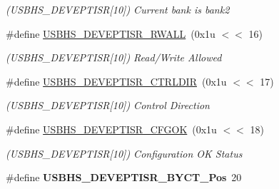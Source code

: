 \begin{DoxyCompactItemize}
\begin{DoxyCompactList}\small\item\em (U\+S\+B\+H\+S\+\_\+\+D\+E\+V\+E\+P\+T\+I\+SR\mbox{[}10\mbox{]}) Current bank is bank2 \end{DoxyCompactList}\item 
\mbox{\label{group__SAMS70__USBHS_gac2222730ead1f5af9fbc5c3759d7b887}} 
\#define \mbox{\hyperlink{group__SAMS70__USBHS_gac2222730ead1f5af9fbc5c3759d7b887}{U\+S\+B\+H\+S\+\_\+\+D\+E\+V\+E\+P\+T\+I\+S\+R\+\_\+\+R\+W\+A\+LL}}~(0x1u $<$$<$ 16)
\begin{DoxyCompactList}\small\item\em (U\+S\+B\+H\+S\+\_\+\+D\+E\+V\+E\+P\+T\+I\+SR\mbox{[}10\mbox{]}) Read/\+Write Allowed \end{DoxyCompactList}\item 
\mbox{\label{group__SAMS70__USBHS_ga771d902b6fdb7b43ba20de29e7a14b8a}} 
\#define \mbox{\hyperlink{group__SAMS70__USBHS_ga771d902b6fdb7b43ba20de29e7a14b8a}{U\+S\+B\+H\+S\+\_\+\+D\+E\+V\+E\+P\+T\+I\+S\+R\+\_\+\+C\+T\+R\+L\+D\+IR}}~(0x1u $<$$<$ 17)
\begin{DoxyCompactList}\small\item\em (U\+S\+B\+H\+S\+\_\+\+D\+E\+V\+E\+P\+T\+I\+SR\mbox{[}10\mbox{]}) Control Direction \end{DoxyCompactList}\item 
\mbox{\label{group__SAMS70__USBHS_gab11ea1f5bd0a35cb8ba91d188561bd13}} 
\#define \mbox{\hyperlink{group__SAMS70__USBHS_gab11ea1f5bd0a35cb8ba91d188561bd13}{U\+S\+B\+H\+S\+\_\+\+D\+E\+V\+E\+P\+T\+I\+S\+R\+\_\+\+C\+F\+G\+OK}}~(0x1u $<$$<$ 18)
\begin{DoxyCompactList}\small\item\em (U\+S\+B\+H\+S\+\_\+\+D\+E\+V\+E\+P\+T\+I\+SR\mbox{[}10\mbox{]}) Configuration OK Status \end{DoxyCompactList}\item 
\mbox{\label{group__SAMS70__USBHS_gad6c9e40343f3741743d60f17568c13e0}} 
\#define {\bfseries U\+S\+B\+H\+S\+\_\+\+D\+E\+V\+E\+P\+T\+I\+S\+R\+\_\+\+B\+Y\+C\+T\+\_\+\+Pos}~20
\item 
\mbox{\label{group__SAMS70__USBHS_ga2e48723f821a7a4a14d06945389604f1}} 
$$
\end{DoxyCompactItemize}
